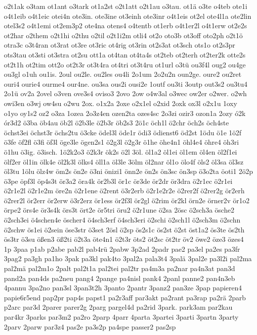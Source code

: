 {o2t1ak
o3tam
ot1ant
o3tark
ot1a2st
o2t1att
o2t1au
o3tau.
ot1ä
o3te
o4teb
ote1i
o4t1eib
o4t1eic
otei4n
ote3in.
ote3ine
ot3einh
ote3inr
o4t1eis
ot2el
ote4l1a
ote2lin
otel3s2
o4t1emi
ot2em3p2
ote4na
otens4
o4tentb
ot1erb
o4t1er2l
o4t1erw
ot2e2s
ot2har
o2them
o2t1hi
o2thu
o2til
o2t1i2m
otli4
ot2o
oto3b
ot3off
oto2ph
o2t1ö
otra3c
o3t4ran
ot3rat
ot3re
ot3ric
ot4rig
ot3rin
ot2s3at
ot3sch
ots1o
ot2s3pr
ots3tau
ot3sti
ot3stra
ot2su
ott1a
ot4tan
ot4ta4s
ot2teb
ot2terh
ot2ter2k
otte2s
ot2t1h
ot2tim
ott2o
ot2t3r
ot3t4ra
ot4tri
ot3t4ru
ot1url
o3tü
ou3f4l
oug2
ou4ge
ou3gl
o1uh
ou1is.
2oul
ou2le.
ou2les
ou4li
2o1um
2o2u2n
oun2ge.
oure2
ou2ret
ouri4
ourie4
ourme4
our4ne.
ou3sa
ous2i
ousi2e
1outf
ou3ti
3outp
out3s2
ou3tu4
2o1ü
ov2a
2ovel
o3ven
ove3s4
oviso3
2ovo
2ow
o4w3al
o3wec
ow2er
o2wer.
o2wh
owi3en
o3wj
ow4su
o2wu
2ox.
o1x2a
2oxe
o2x1el
o2xid
2oxk
ox3l
o2x1u
1oxy
o1yo
oy1s2
oz2
o3za
1ozea
2o3z4en
ozen2ta
ozes4sc
2o3zi
ozir3
ozon1a
2ozy
ó2k
ór3d2
ö3ba
öb4au
öb2l
ö2b3le
ö2b3r
öb2s3
2ö1c
öch1l
ö2chr
öch2s
öch4ste
öchst3ei
öchst3r
öchs2tu
ö3cke
ödel3l
öde1r
ödi3
ödienst6
öd2st
1ödu
ö1e
1ö2f
ö3fe
öf2fl
ö3fi
öf3l
öge3le
ögen2s1
ö2g3l
ö2g3r
ö1he
öhe4n1
öhl4e4
öhre4
öh3ri
ö1hu
ö3ig.
ö3isch.
1ö2k2o3
ö2k3r
ök2s
ö2l
3öl.
öl1a2
öl1ei
öl1em
öl4en
öl2f1ei
ölf2er
öl1in
ölk4e
öl2k3l
ölks4
öll1a
öl3le
3ölm
öl2nar
öl1o
ölo4f
öls2
öl3sa
öl3sz
öl3tu
1ölu
ölz4w
öm2s
ön2e
ö3ni
önizi1
önn2e
ön2s
ön3sc
ön3sp
ö3o2ta
öoti1
2ö2p
ö3pe
öpf3l
öp4s3t
ör3a2
öra4k
ör2b3l
ör1c
ör3de
ör2dr
ör3dra
ö2r1ec
ö2r1ei
ö2r1e2l
ö2r1e2m
öre2n
ö2r1ene
ö2rent
ö3r2erb
ö2r1e2r2e
ö2rer2f
ö2rer2g
ör2erh
ö2rer2l
ör2err
ör2erw
ö3r2erz
ör1ess
ör2f3l
ör2gl
ö2rim
ör2kl
örn2e
örner2v
ör1o2
örpe2
örs4e
ör3s4k
örs3t
ört2e
ör5tri
öru2
ö2r1une
ö2sa
2ösc
ö2sch3a
ösche2
ö2sch3ei
ö4schen4e
öscher4
ö4sch3erf
ö4sch3eri
ö2schi
ö2sch1l
ö2sch3m
ö2schn
ö2schw
ös1ei
ö2sein
öse3str
ö3set
2ösl
ö2sp
ös2s1c
ös2st
ö2st
öst1a2
ös3te
ös2th
ös3tr
ö3su
ößen3
öß2ti
ö2t3a
öte4n1
ö2t3r
öts2
öt2sc
öt2tr
öv2
öwe2
öze3
özes4
1p
3paa
p1ab
p2abe
pab2l
pab4rü
2pabw
3p2ad
2padr
pae2
pa3el
pa2es
pa3fr
3pag2
pa3gh
pa1ho
3pak
pa3kl
pak4to
3pal2a
pala3t4
3palä
3pal2e
pa3l2i
pal2ma
pal2mä
pal2m1o
2palt
pal2t1a
pal2tei
pal2tr
pa4m3a
pa2nar
pa4n3at
pan3d
pand2a
pan4ds
pa2neu
pang4
2pange
pa4nisl
pank4
2panl
panne2
pan4n3eb
4pannu
3pa2no
pan3sl
3pan3t2h
3panto
2pantr
3panz2
pan3ze
3pap
papieren4
papie6r5end
pap2pr
pap4s
papst1
pa2r3aff
par3akt
pa2rant
pa3rap
pa2rä
2parb
p2arc
par3d
2parer
parer2g
2parg
pargel4d
pa2rid
3park.
park3am
par2kau
par4kr
3parks
par3m2
pa2ro
2parp
4parr
4parta
3partei
3parti
3partn
3party
2parv
2parw
par3z4
pas2e
pa3s2p
pa4spe
passer2
pas2sp
}
